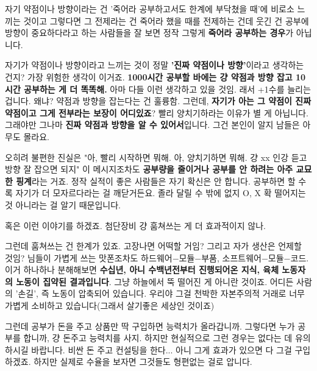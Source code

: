 자기 약점이나 방향이라는 건 '죽어라 공부하고서도 한계에 부닥쳤을 때'에 비로소 느끼는 것이고
그렇다면 그 전제라는 건 죽어라 했을 때를 전제하는 건데
웃긴 건 공부에 방향이 중요하다라고 하는 사람들을 잘 보면 정작 그렇게 \textbf{죽어라 공부하는 경우}가 아닙니다.
\vspace{5mm}

자기가 약점이나 방향이라고 느끼는 것이 정말 \textbf{'진짜 약점이나 방향'}이라고 생각하는 건지?
가장 위험한 생각이 이거죠.
\textbf{1000시간 공부할 바에는 걍 약점과 방향 잡고 10시간 공부하는 게 더 똑똑해.}
아마 다들 이런 생각하고 있을 것임. 래서 +1수를 늘리는 겁니다.
왜냐? 약점과 방향을 잡는다는 건 훌륭함. 그런데, \textbf{자기가 아는 그 약점이 진짜 약점이고 그게 전부라는 보장이 어디있죠}?
빨리 양치기하라는 이유가 별 게 아닙니다. 그래야만 그나마 \textbf{진짜 약점과 방향을 알 수 있어서}입니다.
그건 본인이 알지 남들은 아무도 몰라요.
\vspace{5mm}

오히려 불편한 진실은 "아, 빨리 시작하면 뭐해. 아, 양치기하면 뭐해. 걍 xx 인강 듣고 방향 잘 잡으면 되지"
이 메시지조차도 \textbf{공부량을 줄이거나 공부를 안 하려는 아주 교묘한 핑계}라는 거죠.
정작 실적이 좋은 사람들은 자기 확신은 안 합니다. 공부하면 할 수록 자기가 더 모자르다라는 걸 깨닫거든요.
졸라 달릴 수 밖에 없지 O, X 확 떨어지는 것 아니라는 걸 알기 때문입니다.
\vspace{5mm}

혹은 이런 이야기를 하겠죠. 첨단장비 걍 훔쳐쓰는 게 더 효과적이지 않나.
\vspace{5mm}

그런데 훔쳐쓰는 건 한계가 있죠. 고장나면 어떡할 거임? 그리고 자가 생산은 언제할 것임?
님들이 가볍게 쓰는 맛폰조차도 하드웨어$-$모듈$-$부품, 소프트웨어$-$모듈$-$코드.
이거 하나하나 분해해보면 \textbf{수십년, 아니 수백년전부터 진행되어온 지식, 육체 노동자의 노동이 집약된 결과입니다}.
그냥 하늘에서 뚝 떨어진 게 아니란 것이죠. 어디든 사람의 '손길', 즉 노동이 압축되어 있습니다.
우리야 그걸 천박한 자본주의적 거래로 너무 가볍게 소비하고 있습니다(그래서 살기좋은 세상인 것이죠)
\vspace{5mm}

그런데 공부가 돈을 주고 상품만 딱 구입하면 능력치가 올라갑니까.
그렇다면 누가 공부를 합니까, 걍 돈주고 능력치를 사지.
하지만 현실적으로 그런 경우는 없다는 데 유의하시길 바랍니다.
비싼 돈 주고 컨설팅을 한다... 아니 그게 효과가 있으면 다 그걸 구입하겠죠.
하지만 실제로 수율을 보자면 그것들도 형편없는 걸로 압니다.
\vspace{5mm}






